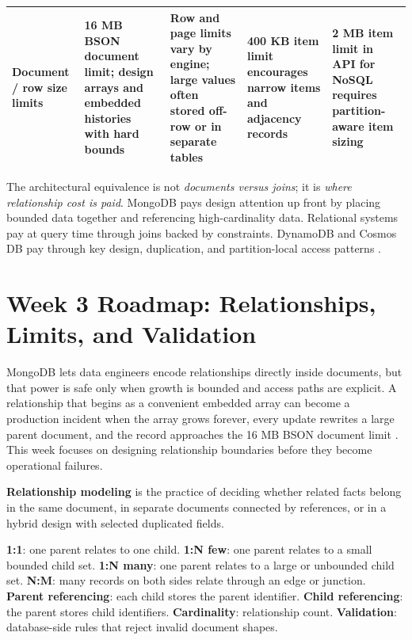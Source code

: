 \begin{crosscloud}
{\begin{tabular}{@{}p{2.4cm}p{3.0cm}p{3.1cm}p{3.1cm}p{3.1cm}@{}}
Document / row size limits & 16 MB BSON document limit; design arrays and embedded histories with hard bounds & Row and page limits vary by engine; large values often stored off-row or in separate tables & 400 KB item limit encourages narrow items and adjacency records & 2 MB item limit in API for NoSQL requires partition-aware item sizing \\
\bottomrule
\end{tabular}}

\vspace{1mm}
The architectural equivalence is not \emph{documents versus joins}; it is \emph{where relationship cost is paid}. MongoDB pays design attention up front by placing bounded data together and referencing high-cardinality data. Relational systems pay at query time through joins backed by constraints. DynamoDB and Cosmos DB pay through key design, duplication, and partition-local access patterns \cite{mongodbDataModelingDocs,mongodbLimitsDocs,mongodbLookupDocs,dynamodbSingleTableDocs,cosmosPartitionDocs}.
\end{crosscloud}

\section{Week 3 Roadmap: Relationships, Limits, and Validation}
MongoDB lets data engineers encode relationships directly inside documents, but that power is safe only when growth is bounded and access paths are explicit. A relationship that begins as a convenient embedded array can become a production incident when the array grows forever, every update rewrites a large parent document, and the record approaches the 16 MB BSON document limit \cite{mongodbLimitsDocs}. This week focuses on designing relationship boundaries before they become operational failures.

\begin{definitionbox}
\textbf{Relationship modeling} is the practice of deciding whether related facts belong in the same document, in separate documents connected by references, or in a hybrid design with selected duplicated fields.
\end{definitionbox}

\begin{keyterms}
\textbf{1:1}: one parent relates to one child. \textbf{1:N few}: one parent relates to a small bounded child set. \textbf{1:N many}: one parent relates to a large or unbounded child set. \textbf{N:M}: many records on both sides relate through an edge or junction. \textbf{Parent referencing}: each child stores the parent identifier. \textbf{Child referencing}: the parent stores child identifiers. \textbf{Cardinality}: relationship count. \textbf{Validation}: database-side rules that reject invalid document shapes.
\end{keyterms}


